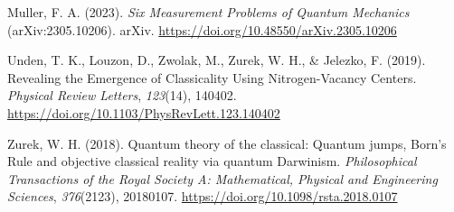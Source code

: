 \documentclass[
]{article}
\newlength{\cslhangindent}
\newenvironment{CSLReferences}[2] %
 {\begin{list}{}{%
  \setlength{\itemindent}{0pt}
  \setlength{\leftmargin}{0pt}
  \setlength{\parsep}{0pt}
  \ifodd #1
   \setlength{\leftmargin}{\cslhangindent}
   \setlength{\itemindent}{-1\cslhangindent}
  \fi
  \setlength{\itemsep}{#2\baselineskip}}}
 {\end{list}}
\begin{document}
\begin{CSLReferences}{1}{0}
Muller, F. A. (2023). \emph{Six {Measurement Problems} of {Quantum
Mechanics}} (arXiv:2305.10206). arXiv.
\url{https://doi.org/10.48550/arXiv.2305.10206}

Unden, T. K., Louzon, D., Zwolak, M., Zurek, W. H., \& Jelezko, F.
(2019). Revealing the {Emergence} of {Classicality Using
Nitrogen-Vacancy Centers}. \emph{Physical Review Letters},
\emph{123}(14), 140402.
\url{https://doi.org/10.1103/PhysRevLett.123.140402}

Zurek, W. H. (2018). Quantum theory of the classical: Quantum jumps,
{Born}'s {Rule} and objective classical reality via quantum {Darwinism}.
\emph{Philosophical Transactions of the Royal Society A: Mathematical,
Physical and Engineering Sciences}, \emph{376}(2123), 20180107.
\url{https://doi.org/10.1098/rsta.2018.0107}

\end{CSLReferences}
\end{document}
